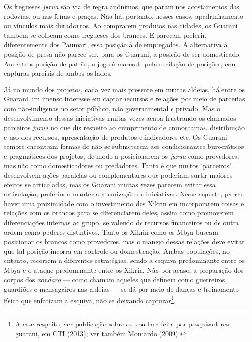 Os fregueses \emph{jurua} são via de regra anônimos, que param nos
acostamentos das rodovias, ou nas feiras e praças. Não há, portanto,
nesses casos, apadrinhamento ou vínculos mais duradouros. Ao comprarem
produtos nas cidades, os Guarani também se colocam como fregueses dos
brancos. E parecem preferir, diferentemente dos Paumari, essa posição à
de empregados. A alternativa à posição de presa não parece ser, para os
Guarani, a posição de ser domesticado. Ausente a posição de patrão, o
jogo é marcado pela oscilação de posições, com capturas parciais de
ambos os lados.

Já no mundo dos projetos, cada vez mais presente em muitas aldeias, há
entre os Guarani um imenso interesse em captar recursos e relações por
meio de parcerias com não-indígenas no setor público, não governamental
e privado. Mas o desenvolvimento dessas iniciativas muitas vezes acaba
frustrando os chamados parceiros \emph{jurua} no que diz respeito ao
cumprimento de cronogramas, distribuição e uso dos recursos,
apresentação de produtos e indicadores etc. Os Guarani sempre encontram
formas de não se submeterem aos condicionantes burocráticos e
pragmáticos dos projetos, de modo a posicionarem os \emph{jurua} como
provedores, mas não como domesticadores ou predadores. Tanto é que
muitos `parceiros' desenvolvem ações paralelas ou complementares que
poderiam surtir maiores efeitos se articuladas, mas os Guarani muitas
vezes parecem evitar essa articulação, preferindo manter a atomização de
iniciativas. Nesse aspecto, parece haver uma proximidade com o
investimento dos Xikrin em incorporarem coisas e relações com os brancos
para se diferenciarem deles, assim como promoverem diferenciações
internas ao grupo, se valendo de recursos financeiros ou de outra ordem
como poderes distintivos. Tanto os Xikrin como os Mbya buscam posicionar
os brancos como provedores, mas o manejo dessas relações deve evitar que
tal posição incorra em controle ou domesticação. Ambas populações, no
entanto, recorrem a diferentes estratégias, sendo a esquiva predominante
entre os Mbya e o ataque predominante entre os Xikrin. Não por acaso, a
preparação dos corpos dos \emph{xondaro} --- como chamam aqueles que
definem como guerreiros, guardiões e mensageiros nas aldeias --- se dá
por meio de danças e treinamento físico que enfatizam a esquiva, não se
deixando capturar\footnote{A esse respeito, ver publicação sobre os
  xondaro feita por pesquisadores guarani, em CTI (2013); ver também
  Montardo (2009).}.

